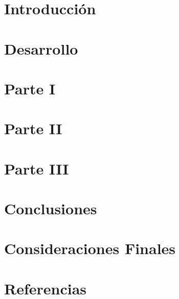 \documentclass{extbook}
\begin{document}

\tableofcontents
\listoffigures
\chapter{Introducción}

\chapter{Desarrollo}
\chapter{Parte I}

\chapter{Parte II}

\chapter{Parte III}

\chapter{Conclusiones}

\chapter{Consideraciones Finales}
\chapter{Referencias}

\end{document}
